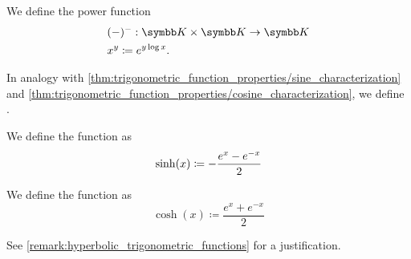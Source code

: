 \begin{definition}\label{def:logarithm}

\end{definition}

\begin{definition}\label{def:power_function}
  We define the power function
  \begin{align*}
    &(-)^{-}: \K \times \K \to \K \\
    &x^y \coloneqq e^{y \log x}.
  \end{align*}
\end{definition}

\begin{definition}\label{def:hyperbolic_trigonometric_functions}
  In analogy with \cref{thm:trigonometric_function_properties/sine_characterization} and \cref{thm:trigonometric_function_properties/cosine_characterization}, we define .

  \begin{defenum}
     We define the  function as
    \begin{equation*}
      \sinh(x) \coloneqq - \frac {e^x - e^{-x}} 2 \\
    \end{equation*}

     We define the  function as
    \begin{equation*}
      \cosh(x) \coloneqq \frac {e^x + e^{-x}} 2
    \end{equation*}
  \end{defenum}

  See \cref{remark:hyperbolic_trigonometric_functions} for a justification.
\end{definition}
